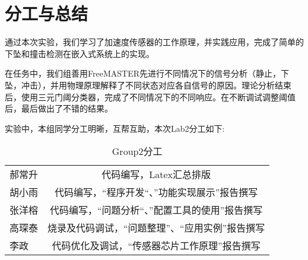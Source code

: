 \section{分工与总结}
\par{通过本次实验，我们学习了加速度传感器的工作原理，并实践应用，完成了简单的下坠和撞击检测在嵌入式系统上的实现。}
\par{在任务中，我们组善用FreeMASTER先进行不同情况下的信号分析（静止，下坠，冲击），并用物理原理解释了不同状态对应各自信号的原因。理论分析结束后，使用三元门阈分类器，完成了不同情况下的不同响应。在不断调试调整阈值后，最后做出了不错的结果。}
\par{实验中，本组同学分工明晰，互帮互助，本次Lab2分工如下:}
\begin{table}[h]
	\centering
	\begin{tabular}{|l|c|}
		郝常升&代码编写，Latex汇总排版\\
		胡小雨&代码编写，“程序开发“、”功能实现展示”报告撰写\\
		张洋榕&代码编写，“问题分析“、”配置工具的使用”报告撰写\\
		高琛泰&烧录及代码调试，“问题整理”、“应用实例”报告撰写\\
		李政&代码优化及调试，“传感器芯片工作原理”报告撰写\\
	\end{tabular}
	\caption{Group2分工}
	\label{tab:Margin_settings}
\end{table} 